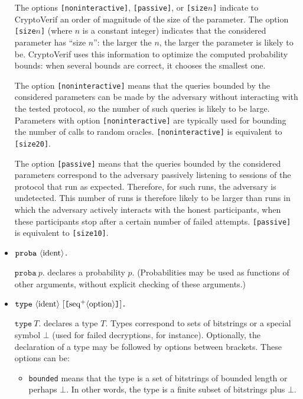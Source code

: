 \begin{itemize}
The options \texttt{[noninteractive]}, \texttt{[passive]}, or \texttt{[size$n$]}
indicate to CryptoVerif an order of magnitude of the size of the parameter.
%
The option \texttt{[size$n$]} (where $n$ is a constant integer) indicates
that the considered parameter has ``size $n$'': the larger the $n$, the
larger the parameter is likely to be.
CryptoVerif uses this
information to optimize the computed probability bounds: when several
bounds are correct, it chooses the smallest one.

The option \texttt{[noninteractive]} means that
the queries bounded by the considered parameters can be made by the
adversary without interacting with the tested protocol, so the number
of such queries is likely to be large.
Parameters with option \texttt{[noninteractive]} are typically 
used for bounding the number of calls to random oracles.
\texttt{[noninteractive]} is equivalent to \texttt{[size20]}.

The option \texttt{[passive]} means that the queries bounded by the
considered parameters correspond to the adversary passively listening
to sessions of the protocol that run as expected. Therefore, for such
runs, the adversary is undetected. This number of runs is therefore
likely to be larger than runs in which the adversary actively 
interacts with the honest participants, when these participants stop 
after a certain number of failed attempts.
\texttt{[passive]} is equivalent to \texttt{[size10]}.

\item $\texttt{proba}\ \nonterm{ident}\texttt{.}$

$\texttt{proba}\ p\texttt{.}$ declares a probability $p$.
(Probabilities may be used as functions of other arguments,
without explicit checking of these arguments.)

\item $\texttt{type}\ \nonterm{ident}\ [\texttt{[}\neseq{option}\texttt{]}]\texttt{.}$

$\texttt{type}\ T\texttt{.}$ declares a type $T$. Types correspond to sets
of bitstrings or a special symbol $\bot$ (used for failed decryptions, 
for instance). Optionally, the declaration of a type may be followed by options
between brackets. These options can be:
\begin{itemize}

\item \texttt{bounded} means that the type is a set of bitstrings of
bounded length or perhaps $\bot$. In other words, the type is a finite
subset of bitstrings plus $\bot$.


\end{itemize}
\end{itemize}
